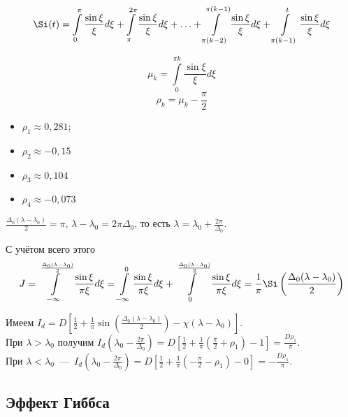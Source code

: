 \begin{equation*}
\Si (t) = \int \limits_0^\pi \frac{\sin \xi}{\xi} d \xi + \int \limits_\pi^{2 \pi} \frac{\sin \xi}{\xi} d \xi + \ldots + \int \limits_{\pi (k - 2)}^{\pi (k - 1)} \frac{\sin \xi}{\xi} d \xi + \int \limits_{\pi (k - 1)}^{t} \frac{\sin \xi}{\xi} d \xi
\end{equation*}

\begin{equation*}
\mu_k = \int \limits_{0}^{\pi k} \frac{\sin \xi}{\xi} d \xi
\end{equation*}
\begin{equation*}
\rho_k = \mu_k - \frac{\pi}{2}
\end{equation*}

\begin{itemize}
\item $\rho_1 \approx 0,281$;
\item $\rho_2 \approx -0,15$
\item $\rho_3 \approx 0,104$
\item $\rho_4 \approx -0,073$
\end{itemize}


$\frac{\Delta_0 (\lambda - \lambda_0)}{2} = \pi$, $\lambda - \lambda_0 = 2 \pi \Delta_0$, то есть $\lambda = \lambda_0 + \frac{2 \pi}{\Delta_0}$.


С учётом всего этого
\begin{equation*}
J = \int \limits_{-\infty}^{\frac{\Delta_{0} (\lambda - \lambda_0)}{2}} \frac{\sin \xi}{\pi \xi} d \xi = \int \limits_{-\infty}^0 \frac{\sin \xi}{\pi \xi} d \xi + \int \limits_0^{\frac{\Delta_{0} (\lambda - \lambda_0)}{2}} \frac{\sin \xi}{\pi \xi} d \xi = \frac{1}{\pi} \Si \left(\frac{\Delta_{0} (\lambda - \lambda_0)}{2}\right)
\end{equation*}

Имеем $I_d = D \left[ \frac{1}{2} + \frac{1}{\pi} \sin \left(\frac{\Delta_{0} (\lambda - \lambda_0)}{2}\right) - \chi (\lambda - \lambda_0) \right]$. \\
При $\lambda > \lambda_0$ получим $I_d \left(\lambda_0 - \frac{2 \pi}{\Delta_0} \right) = D \left[ \frac{1}{2} + \frac{1}{\pi} \left(\frac{\pi}{2} + \rho_1 \right) - 1 \right] = \frac{D \rho_1}{\pi}$.\\
При $\lambda < \lambda_0$~---~$I_d \left(\lambda_0 - \frac{2 \pi}{\Delta_0} \right) = D \left[ \frac{1}{2} + \frac{1}{\pi} \left(-\frac{\pi}{2} - \rho_1 \right) - 0 \right]= -\frac{D \rho_1}{\pi}$.

\subsection*{Эффект Гиббса}

